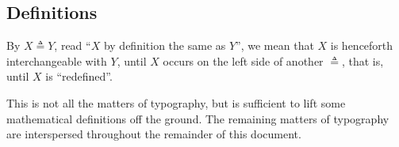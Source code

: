 \subsection{Definitions}

\begin{notation} By $X\triangleq Y$, read ``$X$ by definition the same as
$Y$'', we mean that $X$ is henceforth interchangeable with $Y$, until $X$
occurs on the left side of another $\triangleq$, that is, until $X$ is
``redefined''. \end{notation}

This is not all the matters of typography, but is sufficient to lift some
mathematical definitions off the ground. The remaining matters of typography
are interspersed throughout the remainder of this document.
